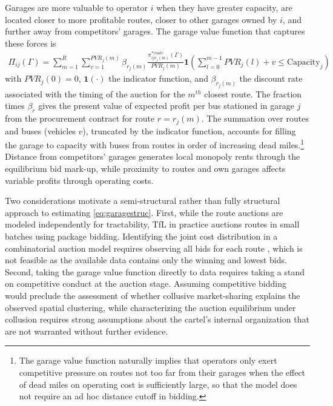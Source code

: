 \documentclass[12pt]{article}
\begin{document}
Garages are more valuable to operator $i$ when they have greater capacity, are located closer to 
more profitable routes, closer to other garages owned by $i$, and further away from 
competitors' garages. The garage value function that captures these forces is
\begin{align}\label{eq:garagestruc}
\Pi_{ij}(\Gamma) = \sum_{m=1}^{R} \sum_{v=1}^{PVR_j(m)} \beta_{r_j(m)} 
\frac{\pi^{*route}_{ijr_j(m)}(\Gamma)}{PVR_j(m)} \mathbf{1}\!\left(\sum_{l=0}^{m-1}
PVR_j(l)+v \leq \text{Capacity}_j\right)
\end{align}
with $PVR_j(0)=0$, $\mathbf{1}(\cdot)$ the indicator function, and 
$\beta_{r_j(m)}$ the discount rate associated with the timing of the auction 
for the $m^{th}$ closest route. The fraction times $\beta_r$ 
gives the present value of expected 
profit per bus stationed in garage $j$ from the procurement contract for route $r=r_j(m)$. 
The summation over routes and buses (vehicles $v$), truncated by the indicator function, 
accounts for filling the garage to capacity with buses from routes in order of 
increasing dead miles.\footnote{The garage value function naturally implies 
that operators only exert competitive pressure on routes not too far from their 
garages when the effect of dead miles on operating cost is sufficiently large, 
so that the model does not require an ad hoc distance cutoff in bidding.} 
Distance from competitors' garages generates local monopoly rents through the 
equilibrium bid mark-up, while proximity to routes and own garages affects 
variable profits through operating costs.

Two considerations motivate a semi-structural rather than fully structural 
approach to estimating \eqref{eq:garagestruc}. First, while the route auctions are modeled 
independently for tractability, TfL in practice auctions routes in small 
batches using package bidding. Identifying the joint cost distribution in a 
combinatorial auction model requires observing all bids for each route 
\citep{Cantillon2007}, which is not feasible as the available data contains 
only the winning and lowest bids. Second, taking the garage value 
function directly to data requires taking a stand on competitive conduct at the 
auction stage. Assuming competitive bidding would preclude the assessment of 
whether collusive market-sharing explains the observed spatial clustering, while 
characterizing the auction equilibrium under collusion requires strong 
assumptions about the cartel's internal organization that are not warranted 
without further evidence. 
\end{document}
